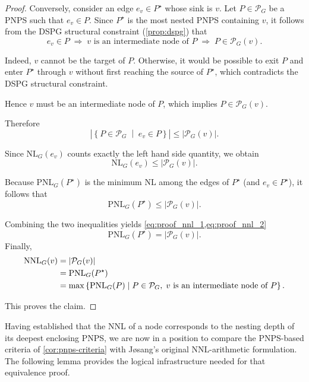 \begin{proof}
Conversely, consider an edge $e_v\in P^\star$ whose sink is $v$.
Let $P\in\mathcal{P}_G$ be a \ac{PNPS} such that $e_v\in P$.
Since $P^\star$ is the most nested \ac{PNPS} containing $v$, it follows from the
\ac{DSPG} structural constraint (\cref{prop:dspg}) that
\[
e_v\in P \;\Rightarrow\; v \text{ is an intermediate node of } P \;\Rightarrow\; P\in\mathcal{P}_G(v) .
\]

Indeed, $v$ cannot be the target of $P$. Otherwise, it would be possible to exit $P$ and enter $P^\star$ through $v$ without first reaching the source of $P^\star$, which contradicts the \ac{DSPG} structural constraint.

Hence $v$ must be an intermediate node of $P$, which implies $P\in\mathcal{P}_G(v)$.

Therefore
\[
\left|
\left\{
P\in\mathcal{P}_G
\;\middle|\;
e_v\in P
\right\}
\right|
\le
|\mathcal{P}_G(v)|.
\]

Since $\mathrm{NL}_G(e_v)$ counts exactly the left hand side quantity, we obtain
\[
\mathrm{NL}_G(e_v)\le |\mathcal{P}_G(v)|.
\]

Because $\mathrm{PNL}_G(P^\star)$ is the minimum $\mathrm{NL}$ among the edges
of $P^\star$ (and $e_v \in P^\star$), it follows that
\begin{equation}
\label{eq:proof_nnl_2}
    \mathrm{PNL}_G(P^\star)\le |\mathcal{P}_G(v)|.
\end{equation}



Combining the two inequalities yields \cref{eq:proof_nnl_1,eq:proof_nnl_2}
\[
\mathrm{PNL}_G(P^\star)=|\mathcal{P}_G(v)|.
\]
Finally, 
\begin{align}
\mathrm{NNL}_G(v) &= |\mathcal{P}_G(v)| \notag \\
&= \mathrm{PNL}_G(P^\star) \notag \\
&= \max\left\{
\mathrm{PNL}_G(P)
\;\middle|\;
P\in\mathcal{P}_G,\; 
v \text{ is an intermediate node of } P
\right\}. \notag
\end{align}

This proves the claim.
\end{proof}
Having established that the \ac{NNL} of a node corresponds to the nesting depth  of its deepest enclosing \ac{PNPS}, we are now in a position to compare the \ac{PNPS}-based criteria of \cref{cor:pnps-criteria} with J{\o}sang's original \ac{NNL}-arithmetic formulation. The following lemma provides the logical infrastructure needed for that equivalence proof.

